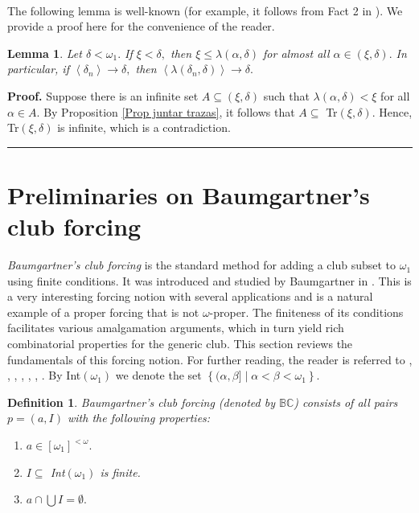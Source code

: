 \documentclass{article}
\newtheorem{definition}[theorem]{Definition}
\newtheorem{lemma}[theorem]{Lemma}
\newenvironment{proof}[1][Proof]{\noindent\textbf{#1.} }{\ \rule{0.5em}{0.5em}}
\begin{document}
\qquad\ \qquad\ \ \ \ 

The following lemma is well-known (for example, it follows from Fact 2 in
\cite{Lspace}). We provide a proof here for the convenience of the reader.

\begin{lemma}
Let $\delta<\omega_{1}.$ If $\xi<\delta,$ then $\xi\leq\lambda\left(
\alpha,\delta\right)  $ for almost all $\alpha\in\left(  \xi,\delta\right)  .$
In particular, if $\left\langle \delta_{n}\right\rangle \longrightarrow
\delta,$ then $\left\langle \lambda\left(  \delta_{n},\delta\right)
\right\rangle \longrightarrow\delta.$ \label{Lemma lambas converjen}
\end{lemma}

\begin{proof}
Suppose there is an infinite set $A\subseteq\left(  \xi,\delta\right)  $ such
that $\lambda\left(  \alpha,\delta\right)  <\xi$ for all $\alpha\in A.$ By
Proposition \ref{Prop juntar trazas}, it follows that $A\subseteq$
\textsf{Tr}$(\xi,\delta).$ Hence, \textsf{Tr}$(\xi,\delta)$ is infinite, which
is a contradiction.
\end{proof}

\section{Preliminaries on Baumgartner's club forcing}

\emph{Baumgartner's club forcing} is the standard method for adding a club
subset to $\omega_{1}$ using finite conditions. It was introduced and studied
by Baumgartner in \cite{ApplicationsofPFA}. This is a very interesting forcing
notion with several applications and is a natural example of a proper forcing
that is not $\omega$-proper. The finiteness of its conditions facilitates
various amalgamation arguments, which in turn yield rich combinatorial
properties for the generic club. This section reviews the fundamentals of this
forcing notion. For further reading, the reader is referred to
\cite{MultipleForcing}, \cite{ApplicationsofPFA}, \cite{ForcingClubs},
\cite{CharacterizationofClubForcing},
\cite{CharacterizationofDefinableForcings}, \cite{AddingBaumgartnerClubs},
\cite{SeparatingClubPrinciples}. By \textsf{Int}$\left(  \omega_{1}\right)  $
we denote the set $\left\{  (\alpha,\beta]\mid\alpha<\beta<\omega_{1}\right\}
.$

\begin{definition}
\emph{Baumgartner's club forcing }(denoted by $\mathbb{BC}$) consists of all
pairs $p=\left(  a,I\right)  $ with the following properties:

\begin{enumerate}
\item $a\in\left[  \omega_{1}\right]  ^{<\omega}.$

\item $I\subseteq$ \textsf{Int}$\left(  \omega_{1}\right)  $ is finite.

\item $a\cap\bigcup I=\emptyset.$
\end{enumerate}
\end{definition}
\end{document}
